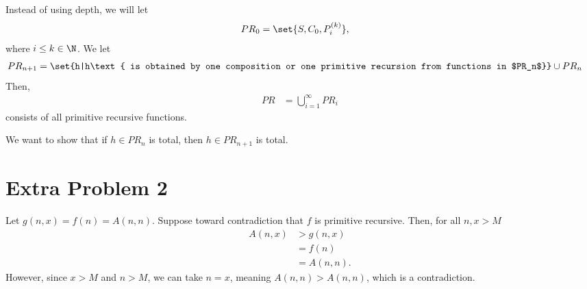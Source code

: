 \documentclass[10pt]{mypackage}
\begin{document}
\begin{solution}[Proof 2]
Instead of using depth, we will let
\begin{align*}
  PR_0 &= \set{S,C_0,P_i^{(k)}},
\end{align*}
where $i\leq k\in \N$. We let
\begin{align*}
  PR_{n+1} &= \set{h|h\text{ is obtained by one composition or one primitive recursion from functions in $PR_n$}}\cup PR_n
\end{align*}
Then,
\begin{align*}
  PR &= \bigcup_{i=1}^{\infty} PR_i
\end{align*}
consists of all primitive recursive functions.\newline

We want to show that if $h\in PR_{n}$ is total, then $h\in PR_{n+1}$ is total.
\end{solution}
\section{Extra Problem 2}%
\begin{problem}
\end{problem}
\begin{solution}
  Let $g\left(n,x\right) = f\left(n\right) = A\left(n,n\right)$. Suppose toward contradiction that $f$ is primitive recursive. Then, for all $n,x > M$
  \begin{align*}
    A\left(n,x\right) &> g\left(n,x\right)\\
                      &= f\left(n\right)\\
                      &= A\left(n,n\right).
  \end{align*}
  However, since $x > M$ and $n > M$, we can take $n = x$, meaning $A\left(n,n\right) > A\left(n,n\right)$, which is a contradiction.
\end{solution}
\end{document}
